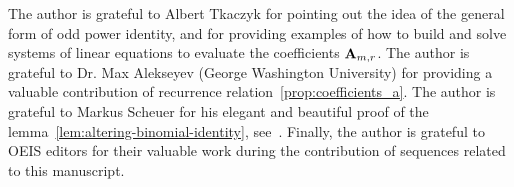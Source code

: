 The author is grateful to Albert Tkaczyk for pointing out the idea of the general form of odd power identity,
and for providing examples of how to build and solve systems of linear equations to evaluate
the coefficients ${\mathbf{A}} \sb{m,r}$.
The author is grateful to Dr. Max Alekseyev (George Washington University) for providing a valuable contribution
of recurrence relation~\eqref{prop:coefficients_a}.
The author is grateful to Markus Scheuer for his elegant and beautiful proof
of the lemma~\eqref{lem:altering-binomial-identity}, see~\cite{scheuer2023mathstackexchange}.
Finally, the author is grateful to OEIS editors for their valuable work during the contribution of sequences
related to this manuscript.
